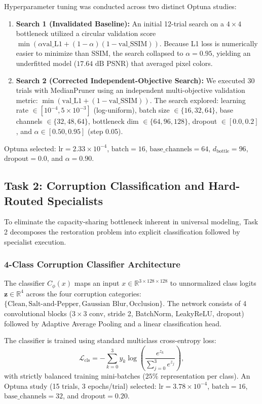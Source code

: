 \documentclass[conference]{IEEEtran}
\begin{document}
Hyperparameter tuning was conducted across two distinct Optuna \cite{akiba2019optuna} studies:
\begin{enumerate}
    \item \textbf{Search 1 (Invalidated Baseline):} An initial 12-trial search on a $4 \times 4$ bottleneck utilized a circular validation score $\min(\alpha \text{val\_L1} + (1-\alpha)(1-\text{val\_SSIM}))$. Because L1 loss is numerically easier to minimize than SSIM, the search collapsed to $\alpha = 0.95$, yielding an underfitted model ($17.64\text{ dB}$ PSNR) that averaged pixel colors.
    \item \textbf{Search 2 (Corrected Independent-Objective Search):} We executed 30 trials with MedianPruner using an independent multi-objective validation metric: $\min(\text{val\_L1} + (1 - \text{val\_SSIM}))$. The search explored: learning rate $\in [10^{-4}, 5\times 10^{-3}]$ (log-uniform), batch size $\in \{16, 32, 64\}$, base channels $\in \{32, 48, 64\}$, bottleneck dim $\in \{64, 96, 128\}$, dropout $\in [0.0, 0.2]$, and $\alpha \in [0.50, 0.95]$ (step 0.05).
\end{enumerate}
Optuna selected: $\text{lr} = 2.33\times 10^{-4}$, $\text{batch} = 16$, $\text{base\_channels} = 64$, $d_{\text{bottle}} = 96$, $\text{dropout} = 0.0$, and $\alpha = 0.90$.

\subsection{Task 2: Corruption Classification and Hard-Routed Specialists}
To eliminate the capacity-sharing bottleneck inherent in universal modeling, Task 2 decomposes the restoration problem into explicit classification followed by specialist execution.

\subsubsection{4-Class Corruption Classifier Architecture}
The classifier $C_\phi(x)$ maps an input $x \in \mathbb{R}^{3 \times 128 \times 128}$ to unnormalized class logits $\mathbf{z} \in \mathbb{R}^4$ across the four corruption categories: $\{\text{Clean}, \text{Salt-and-Pepper}, \text{Gaussian Blur}, \text{Occlusion}\}$. The network consists of 4 convolutional blocks ($3 \times 3$ conv, stride 2, BatchNorm, LeakyReLU, dropout) followed by Adaptive Average Pooling and a linear classification head.

The classifier is trained using standard multiclass cross-entropy loss:
\begin{equation}
\mathcal{L}_{\text{cls}} = -\sum_{k=0}^3 y_k \log\left(\frac{e^{z_k}}{\sum_{j=0}^3 e^{z_j}}\right),
\end{equation}
with strictly balanced training mini-batches ($25\%$ representation per class). An Optuna study (15 trials, 3 epochs/trial) selected: $\text{lr} = 3.78\times 10^{-4}$, $\text{batch} = 16$, $\text{base\_channels} = 32$, and $\text{dropout} = 0.20$.
\end{document}
